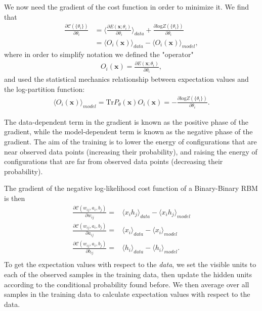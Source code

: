 \documentclass[%
oneside,                 %
final,                   %
10pt]{article}
\begin{document}
We now need the gradient of the cost function in order to minimize it. We find that
\begin{align}
	\frac{\partial \mathcal{C}(\{ \theta_i\})}{\partial \theta_i}
	&= \langle \frac{\partial E(\bm{x}; \theta_i)}{\partial \theta_i} \rangle_{data}
	+ \frac{\partial \text{log} Z(\{ \theta_i\})}{\partial \theta_i} \\
	&= \langle O_i(\bm{x}) \rangle_{data} - \langle O_i(\bm{x}) \rangle_{model},
\end{align}
where in order to simplify notation we defined the "operator"
\begin{align}
	O_i(\bm{x}) = \frac{\partial E(\bm{x}; \theta_i)}{\partial \theta_i}, 
\end{align}
and used the statistical mechanics relationship between expectation values and the log-partition function:
\begin{align}
	\langle O_i(\bm{x}) \rangle_{model} = \text{Tr} P_\theta(\bm{x})O_i(\bm{x}) = - \frac{\partial \text{log} Z(\{ \theta_i\})}{\partial \theta_i}.
\end{align}

The data-dependent term in the gradient is known as the positive phase
of the gradient, while the model-dependent term is known as the
negative phase of the gradient. The aim of the training is to lower
the energy of configurations that are near observed data points
(increasing their probability), and raising the energy of
configurations that are far from observed data points (decreasing
their probability).

The gradient of the negative log-likelihood cost function of a Binary-Binary RBM is then
\begin{align}
	\frac{\partial \mathcal{C} (w_{ij}, a_i, b_j)}{\partial w_{ij}} =& \langle x_i h_j \rangle_{data} - \langle x_i h_j \rangle_{model} \\
	\frac{\partial \mathcal{C} (w_{ij}, a_i, b_j)}{\partial a_{ij}} =& \langle x_i \rangle_{data} - \langle x_i \rangle_{model} \\
	\frac{\partial \mathcal{C} (w_{ij}, a_i, b_j)}{\partial b_{ij}} =& \langle h_i \rangle_{data} - \langle h_i \rangle_{model}. \\
\end{align}
To get the expectation values with respect to the \emph{data}, we set the visible units to each of the observed samples in the training data, then update the hidden units according to the conditional probability found before. We then average over all samples in the training data to calculate expectation values with respect to the data. 
\end{document}
